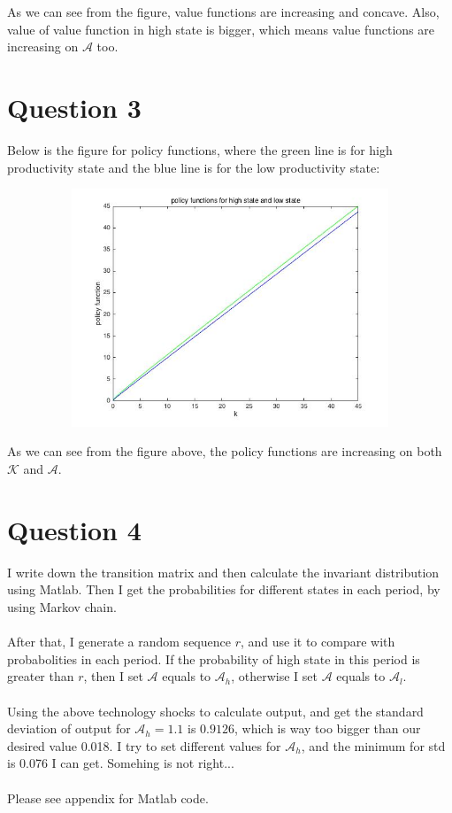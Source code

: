 \documentclass[12pt]{article}
\begin{document}
   \newpage 
   \noindent As we can see from the figure, value functions are increasing and concave. Also, value of value function in high state is bigger, which means value functions are increasing on $\mathcal{A}$ too.
	\\
	\section{Question 3}
	Below is the figure for policy functions, where the green line is for high productivity state and the blue line is for the low productivity state:
	\begin{figure}[!h]{\centering}
		\includegraphics[width=7in,height=2.8in]{pl}
	\end{figure}
    \newline As we can see from the figure above, the policy functions are increasing on both $\mathcal{K}$ and $\mathcal{A}$.
    \section{Question 4}
    I write down the transition matrix and then calculate the invariant distribution using Matlab. Then I get the probabilities for different states in each period, by using Markov chain.\\\\
    After that, I generate a random sequence $r$, and use it to compare with probabolities in each period. If the probability of high state in this period is greater than $r$, then I set $\mathcal{A}$ equals to $\mathcal{A}_h$, otherwise I set $\mathcal{A}$ equals to $\mathcal{A}_l$.\\\\
    Using the above technology shocks to calculate output, and get the standard deviation of output for $\mathcal{A}_h=1.1$ is $0.9126$, which is way too bigger than our desired value 0.018. I try to set different values for $\mathcal{A}_h$, and the minimum for std is 0.076 I can get. Somehing is not right...\\\\
    Please see appendix for Matlab code.
\end{document}
